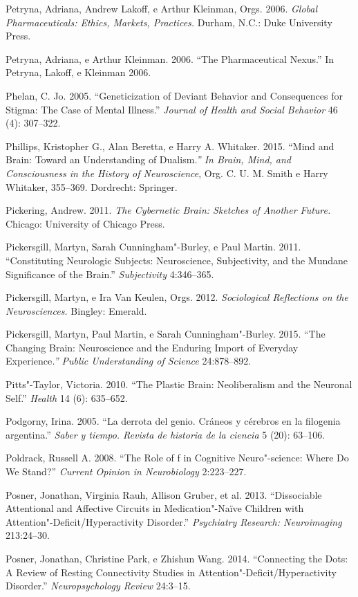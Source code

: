{\begin{Parskip}
Petryna, Adriana, Andrew Lakoff, e Arthur Kleinman, Orgs. 2006.
\emph{Global Pharmaceuticals: Ethics, Markets, Practices.} Durham, N.C.:
Duke University Press.

Petryna, Adriana, e Arthur Kleinman. 2006. ``The Pharmaceutical Nexus.''
In Petryna, Lakoff, e Kleinman 2006.

Phelan, C. Jo. 2005. ``Geneticization of Deviant Behavior and
Consequences for Stigma: The Case of Mental Illness.'' \emph{Journal of
Health and Social Behavior} 46 (4): 307--322.

Phillips, Kristopher G., Alan Beretta, e Harry A. Whitaker. 2015. ``Mind
and Brain: Toward an Understanding of Dualism\emph{.'' In Brain, Mind,
and Consciousness in the History of Neuroscience}, Org. C. U. M. Smith e
Harry Whitaker, 355--369. Dordrecht: Springer.

Pickering, Andrew. 2011. \emph{The Cybernetic Brain: Sketches of Another
Future.} Chicago: University of Chicago Press.

Pickersgill, Martyn, Sarah Cunningham"-Burley, e Paul Martin. 2011.
``Constituting Neurologic Subjects: Neuroscience, Subjectivity, and the
Mundane Significance of the Brain.'' \emph{Subjectivity} 4:346--365.

Pickersgill, Martyn, e Ira Van Keulen, Orgs. 2012. \emph{Sociological
Reflections on the Neurosciences.} Bingley: Emerald.

Pickersgill, Martyn, Paul Martin, e Sarah Cunningham"-Burley. 2015. ``The
Changing Brain: Neuroscience and the Enduring Import of Everyday
Experience\emph{.'' Public Understanding of Science} 24:878--892.

Pitts"-Taylor, Victoria. 2010. ``The Plastic Brain: Neoliberalism and the
Neuronal Self.'' \emph{Health} 14 (6): 635--652.

Podgorny, Irina. 2005. ``La derrota del genio. Cráneos y cérebros en la
filogenia argentina.'' \emph{Saber y tiempo. Revista de historia de la
ciencia} 5 (20): 63--106.

Poldrack, Russell A. 2008. ``The Role of f in Cognitive
Neuro"-science: Where Do We Stand?'' \emph{Current Opinion in
Neurobiology} 2:223--227.

Posner, Jonathan, Virginia Rauh, Allison Gruber, et al. 2013.
``Dissociable Attentional and Affective Circuits in Medication"-Naïve
Children with Attention"-Deficit/Hyperactivity Disorder.''
\emph{Psychiatry Research: Neuroimaging} 213:24--30.

Posner, Jonathan, Christine Park, e Zhishun Wang. 2014. ``Connecting the
Dots: A Review of Resting Connectivity  Studies in
Attention"-Deficit/Hyperactivity Disorder.'' \emph{Neuropsychology
Review} 24:3--15.


\end{Parskip}}
